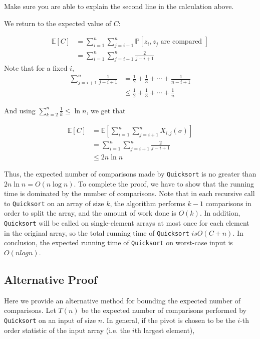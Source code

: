 \documentclass [12pt]{article}
\begin{document}
Make sure you are able to explain the second line in the calculation above.

We return to the expected value of $C$:

\begin{align*}
\mathbb{E}[C] &= \sum_{i=1}^n \sum_{j = i + 1}^n \mathbb{P}[z_i, z_j \text{ are compared }] \\
&= \sum_{i=1}^n \sum_{j = i + 1}^n \frac{2}{j-i + 1}
\end{align*}
Note that for a fixed $i$,
\begin{align*}
  \sum_{j=i+1}^n \frac{1}{j-i+1} &= \frac{1}{2} + \frac{1}{3} + \cdots + \frac{1}{n - i + 1} \\
  &\leq \frac{1}{2} + \frac{1}{3} + \cdots + \frac{1}{n}
\end{align*}

And using $\sum_{k=2}^n \frac{1}{k} \leq \ln n$, we get that

\begin{align*}
\mathbb{E}[C] &= \mathbb{E}\left[\sum_{i=1}^n \sum_{j = i + 1}^n X_{i,j}(\sigma) \right] \\
&= \sum_{i=1}^n \sum_{j = i + 1}^n \frac{2}{j-i + 1}\\
&\leq 2n \ln n
\end{align*}
 
 Thus, the expected number of comparisons made by \texttt{Quicksort} is no greater than $2n \ln n = O(n \log n)$. To complete the proof, we have to show that the running time is dominated by the number of comparisons. Note that in each recursive call to \texttt{Quicksort} on an array of size $k$, the algorithm performs $k - 1$ comparisons in order to split the array, and the amount of work done is $O(k)$. In addition, \texttt{Quicksort} will be called on single-element arrays at most once for each element in the original array, so the total running time of \texttt{Quicksort} $is O(C + n)$. In conclusion, the expected running time of \texttt{Quicksort} on worst-case input is $O(n log n)$.

 \subsection{Alternative Proof}

Here we provide an alternative method for bounding the expected number of comparisons. Let $T(n)$ be the expected number of comparisons performed by \texttt{Quicksort} on an input of size $n$. In general, if the pivot is chosen to be the $i$-th order statistic of the input array (i.e. the $i$th largest element),
\end{document}
